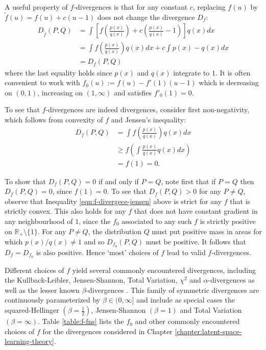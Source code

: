 A useful property of $f$-divergences is that for any constant $c$, replacing $f(u)$ by $\tilde{f}(u) = f(u) + c(u-1)$ does not change the divergence $D_f$:
%
\begin{align*}
D_{\tilde{f}}(P, Q) &= \int \left[ f\left(\frac{p(x)}{q(x)}\right) + c\left(\frac{p(x)}{q(x)} - 1\right) \right] q(x) dx \\
&=  \int f\left(\frac{p(x)}{q(x)}\right) q(x) dx + c \int p(x) - q(x) dx \\
&= D_f(P, Q)
\end{align*}
%
where the last equality holds since $p(x)$ and $q(x)$ integrate to $1$.
It is often convenient to work with $f_0(u) := f(u) - f'(1)(u-1)$ which is decreasing on $(0, 1)$, increasing on $(1, \infty)$ and satisfies $f'_0(1)=0$.


To see that $f$-divergences are indeed divergences, consider first non-negativity, which follows from convexity of $f$ and Jensen's inequality:
%
\begin{align}
D_f(P, Q) &= \int f\left(\frac{p(x)}{q(x)}\right) q(x) dx \nonumber \\ 
&\geq f\left(\int \frac{p(x)}{q(x)} q(x) dx\right) \label{eqn:f-divergece-jensen}\\
&= f(1) = 0. \nonumber
\end{align}
%

To show that $D_f(P,Q) = 0$ if and only if $P=Q$, note first that if $P=Q$ then $D_f(P,Q) = 0$, since $f(1)=0$.
To see that $D_f(P,Q) > 0$ for any $P \not= Q$, observe that Inequality \ref{eqn:f-divergece-jensen} above is strict for any $f$ that is strictly convex.
%
This also holds for any $f$ that does not have constant gradient in any neighbourhood of $1$, since the $f_0$ associated to any such $f$ is strictly positive on $\mathbb{R}_+\setminus \{1\}$.
For any $P\not= Q$, the distribution $Q$ must put positive mass in areas for which $p(x)/q(x) \not= 1$ and so  $D_{f_0}(P,Q)$ must be positive.
It follows that $D_f = D_{f_0}$ is also positive.
Hence `most' choices of $f$ lead to valid $f$-divergences.


Different choices of $f$ yield several commonly encountered divergences, including the Kullback-Leibler, Jensen-Shannon, Total Variation, $\chi^2$ and $\alpha$-divergences as well as the lesser known $\beta$-divergences \citep{osterreicher2003new}.
This family of symmetric divergences are continuously parameterized by $\beta\in(0, \infty]$ and include as special cases the squared-Hellinger $({\beta=\frac{1}{2}})$,  Jensen-Shannon $(\beta=1)$ and Total Variation $(\beta=\infty)$. 
Table \ref{table:f-fns} lists the $f_0$ and other commonly encountered choices of $f$ for the divergences considered in Chapter \ref{chapter:latent-space-learning-theory}.

